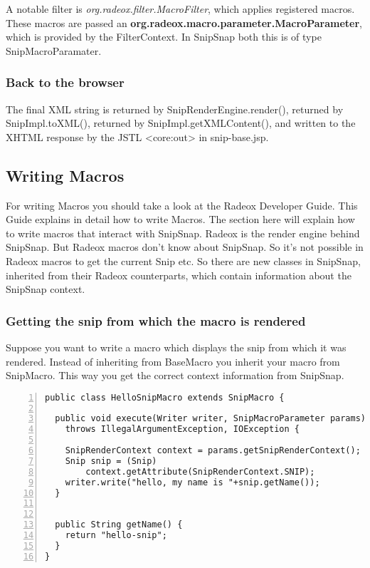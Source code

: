 \documentclass[a4paper,pdftex]{article}
\begin{document}
A notable filter is \textit{org.radeox.filter.MacroFilter}, which applies registered macros.  These macros are 
passed an \textbf{org.radeox.macro.parameter.MacroParameter}, which is provided by the FilterContext.
In SnipSnap both this is of type SnipMacroParamater.

\subsubsection{Back to the browser}
The final XML string is returned by SnipRenderEngine.render(), 
returned by SnipImpl.toXML(), returned by SnipImpl.getXMLContent(), 
and written to the XHTML response by the JSTL <core:out> in snip-base.jsp.

\subsection{Writing Macros}

For writing  Macros you should take a look at the Radeox Developer Guide\cite{RadeoxDeveloperGuide}. This Guide explains in 
detail how to write Macros. The section here will explain how to write macros that interact with
SnipSnap. Radeox is the render engine behind SnipSnap. But Radeox macros don't know about SnipSnap. 
So it's not possible in Radeox macros to get the current Snip etc. So there are new classes in SnipSnap,
inherited from their Radeox counterparts, which contain information about the SnipSnap context.

\subsubsection{Getting the snip from which the macro is rendered}

Suppose you want to write a macro which displays the snip from which it was rendered.
Instead of inheriting from BaseMacro you inherit your macro from SnipMacro. This
way you get the correct context information from SnipSnap.

\begin{Verbatim}[gobble=0,frame=single,numbers=left,fontsize=\small]
public class HelloSnipMacro extends SnipMacro {

  public void execute(Writer writer, SnipMacroParameter params)
    throws IllegalArgumentException, IOException {

    SnipRenderContext context = params.getSnipRenderContext();
    Snip snip = (Snip)
        context.getAttribute(SnipRenderContext.SNIP);
    writer.write("hello, my name is "+snip.getName());
  }


  public String getName() {
    return "hello-snip";
  }
}
\end{Verbatim}
\end{document}
